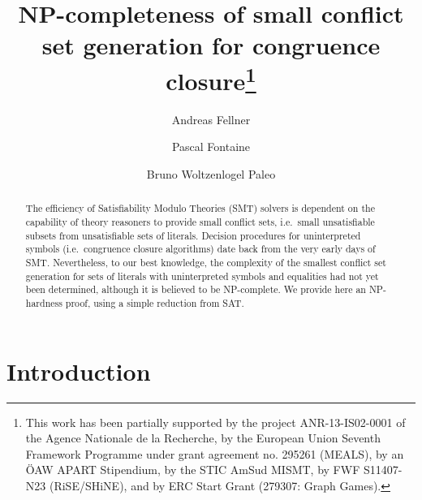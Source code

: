\documentclass[smallextended]{svjour3}
\title{NP-completeness of small conflict set generation for congruence closure\thanks{This work has been partially supported by the project ANR-13-IS02-0001 of the Agence Nationale de la Recherche, by the European Union Seventh Framework Programme under grant agreement no. 295261 (MEALS), by an ÖAW APART Stipendium, by the STIC AmSud MISMT, by FWF S11407-N23 (RiSE/SHiNE), and by ERC Start Grant (279307: Graph Games).}}
\author{Andreas Fellner%
   \and Pascal Fontaine%
   \and Bruno Woltzenlogel Paleo%
}
\institute{
A. Fellner \at
  Austrian Institute of Technology and
  Vienna University of Technology (Austria)
\and
P. Fontaine \at
  Inria, Loria, U. of Lorraine (France)
\and
B. Woltzenlogel Paleo \at
  Australian National University (Australia)
}
\begin{document}
\maketitle

\begin{abstract}
The efficiency of Satisfiability Modulo Theories (SMT) solvers is dependent on the capability of theory reasoners to provide small conflict sets, i.e.\ small unsatisfiable subsets from unsatisfiable sets of literals.  Decision procedures for uninterpreted symbols (i.e.\ congruence closure algorithms) date back from the very early days of SMT.  Nevertheless, to our best knowledge, the complexity of the smallest conflict set generation for sets of literals with uninterpreted symbols and equalities had not yet been determined, although it is believed to be NP-complete.  We provide here an NP-hardness proof, using a simple reduction from SAT.
\end{abstract}


\section*{Introduction}
\end{document}
